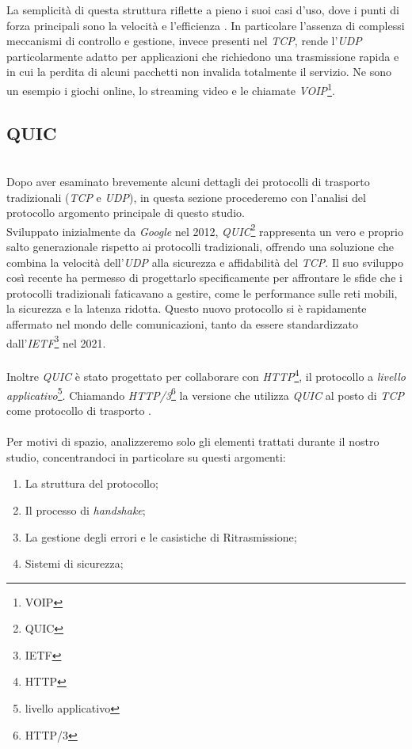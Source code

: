 \noindent La semplicità di questa struttura riflette a pieno i suoi casi d'uso, dove i punti di forza principali sono la velocità e l'efficienza \cite{site:udp}.
In particolare l'assenza di complessi meccanismi di controllo e gestione, invece presenti nel \emph{TCP}, rende l'\emph{UDP} particolarmente adatto per applicazioni che richiedono una trasmissione rapida e in cui la perdita di alcuni pacchetti non invalida totalmente il servizio.
Ne sono un esempio i giochi online, lo streaming video e le chiamate \emph{VOIP}\footnote{\gls{VOIP}}.

\subsection{QUIC}
~\\
\indent Dopo aver esaminato brevemente alcuni dettagli dei protocolli di trasporto tradizionali (\emph{TCP} e \emph{UDP}), in questa sezione procederemo con l'analisi del protocollo argomento principale di questo studio. \\
Sviluppato inizialmente da \emph{Google} nel 2012, \emph{QUIC}\footnote{\gls{QUIC}} rappresenta un vero e proprio salto generazionale rispetto ai protocolli tradizionali, offrendo una soluzione che combina la velocità dell'\emph{UDP} alla sicurezza e affidabilità del \emph{TCP}. 
Il suo sviluppo così recente ha permesso di progettarlo specificamente per affrontare le sfide che i protocolli tradizionali faticavano a gestire, come le performance sulle reti mobili, la sicurezza e la latenza ridotta. Questo nuovo protocollo si è rapidamente affermato nel mondo delle comunicazioni, tanto da essere standardizzato dall'\emph{IETF}\footnote{\gls{IETF}} nel 2021.
\\\\
Inoltre \emph{QUIC} è stato progettato per collaborare con \emph{HTTP}\footnote{\gls{HTTP}}, il protocollo a \emph{livello applicativo}\footnote{\gls{livello applicativo}}. Chiamando \emph{HTTP/3}\footnote{\gls{HTTP/3}} la versione che utilizza \emph{QUIC} al posto di \emph{TCP} come protocollo di trasporto \cite{site:HTTP-over-QUIC}.
\\\\
\noindent Per motivi di spazio, analizzeremo solo gli elementi trattati durante il nostro studio, concentrandoci in particolare su questi argomenti:
\begin{enumerate}
    \item La struttura del protocollo;
    \item Il processo di \emph{handshake};
    \item La gestione degli errori e le casistiche di Ritrasmissione;
    \item Sistemi di sicurezza;
\end{enumerate}

